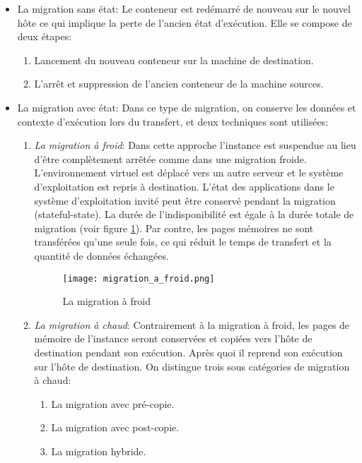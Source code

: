 \begin{itemize}
  \item La migration sans état: Le conteneur est redémarré de nouveau sur le nouvel hôte ce qui implique la perte de l'ancien état d'exécution. Elle se compose de deux étapes:
  \begin{enumerate}
    \item Lancement du nouveau conteneur sur la machine de destination.
    \item L'arrêt et suppression de l'ancien conteneur de la machine sources.
  \end{enumerate}
  \item La migration avec état: Dans ce type de migration, on conserve les données et contexte d'exécution lors du transfert, et deux techniques sont utilisées:
    \begin{enumerate}
      \item \emph{La migration à froid}: Dans cette approche l'instance est suspendue au lieu d'être complètement arrêtée comme dans une migration froide. L'environnement virtuel est déplacé vers un autre serveur et le système d'exploitation est repris à destination. L'état des applications dans le système d'exploitation invité peut être conservé pendant la migration (stateful-state). La durée de l'indisponibilité est égale à la durée totale de migration (voir figure \ref{fig:migration_a_froid}). Par contre, les pages mémoires ne sont transférées qu'une seule fois, ce qui réduit le temps de transfert et la quantité de données échangées.
      \begin{figure}[H]
      \centering
      \texttt{[image: migration\_a\_froid.png]}
      \caption{La migration à froid \cite{puliafito2019}}
      \label{fig:migration_a_froid}
      \end{figure}
      \item \emph{La migration à chaud}: Contrairement à la migration à froid, les pages de mémoire de l'instance seront conservées et copiées vers l'hôte de destination pendant son exécution. Après quoi il reprend son exécution sur l'hôte de destination. On distingue trois sous catégories de migration à chaud:
        \begin{enumerate}
          \item La migration avec pré-copie.
          \item La migration avec post-copie.
          \item La migration hybride.
        \end{enumerate}
      \end{enumerate}
\end{itemize}
